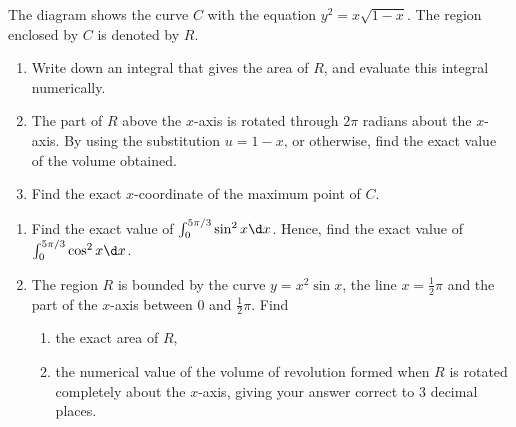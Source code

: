 \begin{problem}
    The diagram shows the curve $C$ with the equation $y^{2}=x\sqrt{1-x}$. The region enclosed by $C$ is denoted by $R$.

    \begin{figure}[H]
        \centering
    \end{figure}
    
    \begin{enumerate}
        \item Write down an integral that gives the area of $R$, and evaluate this integral numerically.
        \item The part of $R$ above the $x$-axis is rotated through $2\pi$ radians about the $x$-axis. By using the substitution $u=1-x$, or otherwise, find the exact value of the volume obtained.
        \item Find the exact $x$-coordinate of the maximum point of $C$.
    \end{enumerate}
\end{problem}

\begin{problem}
    \begin{enumerate}
        \item Find the exact value of $\int_{0}^{5\pi/3}\sin^{2}x \d x$. Hence, find the exact value of $\int_{0}^{5\pi/3}\cos^{2}x \d x$.
        \item The region $R$ is bounded by the curve $y=x^{2}\sin x$, the line $x=\frac{1}{2}\pi$ and the part of the $x$-axis between $0$ and $\frac{1}{2}\pi$. Find
        \begin{enumerate}
            \item the exact area of $R$,
            \item the numerical value of the volume of revolution formed when $R$ is rotated completely about the $x$-axis, giving your answer correct to 3 decimal places.
        \end{enumerate}
    \end{enumerate}
\end{problem}

